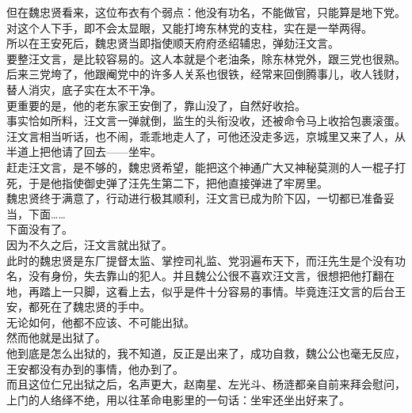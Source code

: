 \begin{multicols}{\theparacolNo}
但在魏忠贤看来，这位布衣有个弱点：他没有功名，不能做官，只能算是地下党。对这个人下手，即不会太显眼，又能打垮东林党的支柱，实在是一举两得。\\

所以在王安死后，魏忠贤当即指使顺天府府丞绍辅忠，弹劾汪文言。\\

要整汪文言，是比较容易的。这人本就是个老油条，除东林党外，跟三党也很熟。后来三党垮了，他跟阉党中的许多人关系也很铁，经常来回倒腾事儿，收人钱财，替人消灾，底子实在太不干净。\\

更重要的是，他的老东家王安倒了，靠山没了，自然好收拾。\\

事实恰如所料，汪文言一弹就倒，监生的头衔没收，还被命令马上收拾包裹滚蛋。\\

汪文言相当听话，也不闹，乖乖地走人了，可他还没走多远，京城里又来了人，从半道上把他请了回去——坐牢。\\

赶走汪文言，是不够的，魏忠贤希望，能把这个神通广大又神秘莫测的人一棍子打死，于是他指使御史弹了汪先生第二下，把他直接弹进了牢房里。\\

魏忠贤终于满意了，行动进行极其顺利，汪文言已成为阶下囚，一切都已准备妥当，下面……\\

下面没有了。\\

因为不久之后，汪文言就出狱了。\\

此时的魏忠贤是东厂提督太监、掌控司礼监、党羽遍布天下，而汪先生是个没有功名，没有身份，失去靠山的犯人。并且魏公公很不喜欢汪文言，很想把他打翻在地，再踏上一只脚，这看上去，似乎是件十分容易的事情。毕竟连汪文言的后台王安，都死在了魏忠贤的手中。\\

无论如何，他都不应该、不可能出狱。\\

然而他就是出狱了。\\

他到底是怎么出狱的，我不知道，反正是出来了，成功自救，魏公公也毫无反应，王安都没有办到的事情，他办到了。\\

而且这位仁兄出狱之后，名声更大，赵南星、左光斗、杨涟都亲自前来拜会慰问，上门的人络绎不绝，用以往革命电影里的一句话：坐牢还坐出好来了。\\


\end{multicols}
